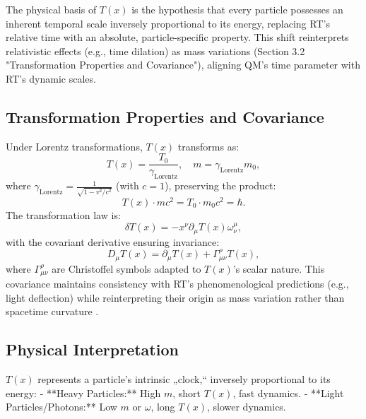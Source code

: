 \documentclass[12pt,a4paper]{article}
\newcommand{\Tfield}{T(x)}
\newcommand{\Tzero}{T_0}
\newcommand{\gammaf}{\gamma_{\text{Lorentz}}}
\begin{document}
	The physical basis of \(\Tfield\) is the hypothesis that every particle possesses an inherent temporal scale inversely proportional to its energy, replacing RT’s relative time with an absolute, particle-specific property. This shift reinterprets relativistic effects (e.g., time dilation) as mass variations (Section 3.2 "Transformation Properties and Covariance"), aligning QM’s time parameter with RT’s dynamic scales.
	
	\subsection{Transformation Properties and Covariance}
	\label{subsec:transformations}
	
	Under Lorentz transformations, \(\Tfield\) transforms as:
	\begin{equation}
		\Tfield = \frac{\Tzero}{\gammaf}, \quad m = \gammaf m_0,
		\label{eq:transform}
	\end{equation}
	where \(\gammaf = \frac{1}{\sqrt{1 - v^2/c^2}}\) (with \(c = 1\)), preserving the product:
	\begin{equation}
		\Tfield \cdot m c^2 = \Tzero \cdot m_0 c^2 = \hbar.
		\label{eq:invariant_product}
	\end{equation}
	The transformation law is:
	\begin{equation}
		\delta\Tfield = -x^{\nu}\partial_{\mu}\Tfield\omega_{\nu}^{\mu},
		\label{eq:lorentz_transform}
	\end{equation}
	with the covariant derivative ensuring invariance:
	\begin{equation}
		D_{\mu}\Tfield = \partial_{\mu}\Tfield + \Gamma_{\mu\nu}^{\rho}\Tfield,
		\label{eq:covariant_derivative}
	\end{equation}
	where \(\Gamma_{\mu\nu}^{\rho}\) are Christoffel symbols adapted to \(\Tfield\)’s scalar nature. This covariance maintains consistency with RT’s phenomenological predictions (e.g., light deflection) while reinterpreting their origin as mass variation rather than spacetime curvature \cite{pascher_lagrange_2025}.
	
	\subsection{Physical Interpretation}
	\label{subsec:time_interpretation}
	
	\(\Tfield\) represents a particle’s intrinsic „clock,“ inversely proportional to its energy:
	- **Heavy Particles:** High \(m\), short \(\Tfield\), fast dynamics.
	- **Light Particles/Photons:** Low \(m\) or \(\omega\), long \(\Tfield\), slower dynamics.
	
\end{document}
